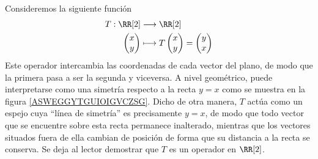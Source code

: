 \begin{examplebox}{}{}
    Consideremos la siguiente función
    \begin{align*}
        T: \RR[2] & \longrightarrow \RR[2] \\
        \begin{pmatrix}
            x \\
            y
        \end{pmatrix} & \longmapsto T \begin{pmatrix}
            x \\
            y
        \end{pmatrix} = \begin{pmatrix}
            y \\
            x
        \end{pmatrix}
    \end{align*}
    Este operador intercambia las coordenadas de cada vector del plano, de modo que la primera pasa a ser la segunda y viceversa. A nivel geométrico, puede interpretarse como una simetría respecto a la recta $y = x$ como se muestra en la figura \ref{ASWEGGYTGUIOIGVCZSG}. Dicho de otra manera, $T$ actúa como un espejo cuya “línea de simetría” es precisamente $y = x$, de modo que todo vector que se encuentre sobre esta recta permanece inalterado, mientras que los vectores situados fuera de ella cambian de posición de forma que su distancia a la recta se conserva. Se deja al lector demostrar que $T$ es un operador en $\RR[2]$.
\end{examplebox}

